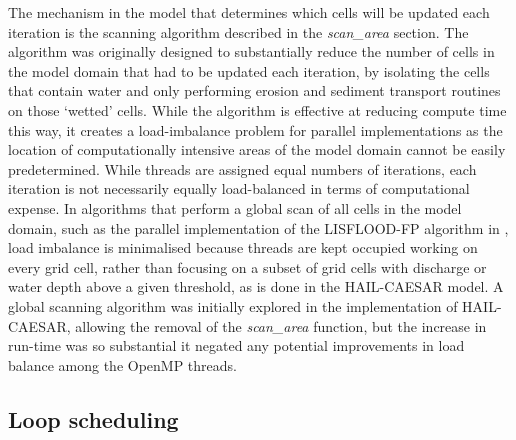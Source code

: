 The mechanism in the model that determines which cells will be updated each iteration is the scanning algorithm described in the \textit{scan\_area} section. The algorithm was originally designed \citep{Coulthard2013} to substantially reduce the number of cells in the model domain that had to be updated each iteration, by isolating the cells that contain water and only performing erosion and sediment transport routines on those `wetted' cells. While the algorithm is effective at reducing compute time this way, it creates a load-imbalance problem for parallel implementations as the location of computationally intensive areas of the model domain cannot be easily predetermined. While threads are assigned equal numbers of iterations, each iteration is not necessarily equally load-balanced in terms of computational expense. In algorithms that perform a global scan of all cells in the model domain, such as the parallel implementation of the LISFLOOD-FP algorithm in \citet{neal2009parallelisation}, load imbalance is minimalised because threads are kept occupied working on every grid cell, rather than focusing on a subset of grid cells with discharge or water depth above a given threshold, as is done in the HAIL-CAESAR model. A global scanning algorithm was initially explored in the implementation of HAIL-CAESAR, allowing the removal of the \textit{scan\_area} function, but the increase in run-time was so substantial it negated any potential improvements in load balance among the OpenMP threads. 

\subsection{Loop scheduling}

